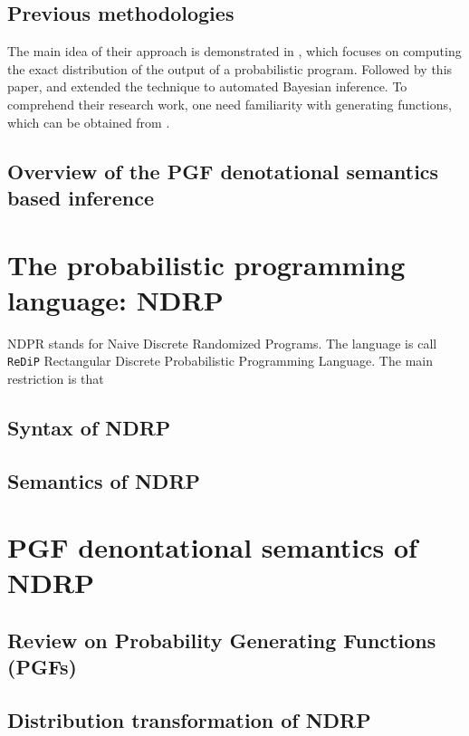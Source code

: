 \documentclass[a4paper]{article}
\begin{document}
\subsection{Previous methodologies}

The main idea of their approach is demonstrated in \cite{cav-pgf}, which focuses on computing the exact distribution of the output of a probabilistic program. Followed by this paper, \cite{OOPSLA2024-inf-loop} and \cite{lafi-inf} extended the technique to automated Bayesian inference.
To comprehend their research work, one need familiarity with generating functions, which can be obtained from \cite{gfbook}.

\subsection{Overview of the PGF denotational semantics based inference}

\section{The probabilistic programming language: NDRP}

NDPR stands for Naive Discrete Randomized Programs.
The language is call \texttt{ReDiP} Rectangular Discrete Probabilistic Programming Language.
The main restriction is that

\subsection{Syntax of NDRP}

\subsection{Semantics of NDRP}

\section{PGF denontational semantics of NDRP}

\subsection{Review on Probability Generating Functions (PGFs)}

\subsection{Distribution transformation of NDRP}
\end{document}
